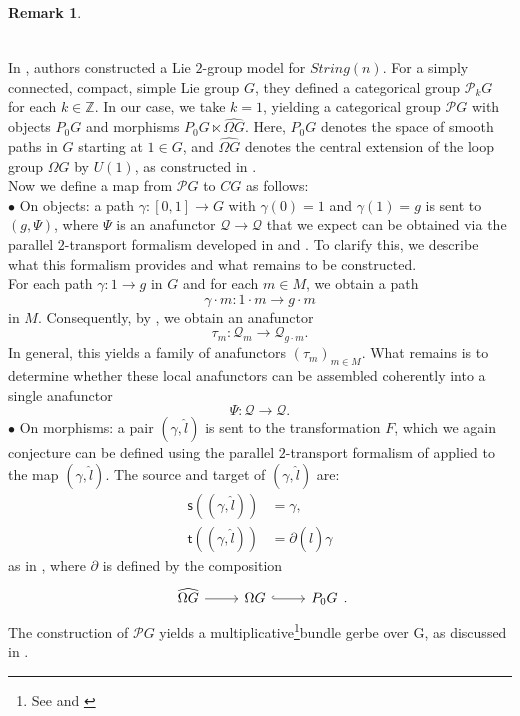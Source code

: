 \documentclass{article}
\theoremstyle{plain}
\theoremstyle{definition}
\newtheorem{rem}[thm]{Remark}
\begin{document}
\begin{rem}
\[\begin{tikzcd}
\end{tikzcd}
\]
In \cite{MR2366945}, authors constructed a Lie $2$-group model for $String(n)$. For a simply connected, compact, simple Lie group $G$, they defined a categorical group $\mathcal{P}_k G$ for each $k \in \mathbb{Z}$. In our case, we take $k=1$, yielding a categorical group $\mathcal{P}G$ with objects $P_0 G$ and morphisms $P_0 G \ltimes \widehat{\Omega G}$. Here, $P_0 G$ denotes the space of smooth paths in $G$ starting at $1 \in G$, and $\widehat{\Omega G}$ denotes the central extension of the loop group $\Omega G$ by $U(1)$, as constructed in \cite{MR2366945}. \\
Now we define a map from $\mathcal{P}G$ to $CG$ as follows: \\
$\bullet$ On objects: a path $\gamma:[0,1] \to G$ with $\gamma(0) = 1$ and $\gamma(1) = g$ is sent to $(g,\Psi)$, where $\Psi$ is an anafunctor $\mathcal{Q} \longrightarrow \mathcal{Q}$ that we expect can be obtained via the parallel $2$-transport formalism developed in \cite{MR3917427} and \cite{MR3084724}. To clarify this, we describe what this formalism provides and what remains to be constructed. \\
For each path $\gamma:1 \longrightarrow g$ in $G$ and for each $m \in M$, we obtain a path
$$\gamma \cdot m:1 \cdot m \longrightarrow g \cdot m$$
in $M$. Consequently, by \cite{MR3917427}, we obtain an anafunctor
\[
\tau_m:\mathcal{Q}_m \longrightarrow \mathcal{Q}_{g \cdot m}.
\]
In general, this yields a family of anafunctors $(\tau_m)_{m \in M}$. What remains is to determine whether these local anafunctors can be assembled coherently into a single anafunctor
$$\Psi:\mathcal{Q} \longrightarrow \mathcal{Q}.$$
$\bullet$ On morphisms: a pair $(\gamma,\hat{l})$ is sent to the transformation $F$, which we again conjecture can be defined using the parallel $2$-transport formalism of \cite{MR3917427} applied to the map $(\gamma,\hat{l})$. The source and target of $(\gamma,\hat{l})$ are:
\begin{align*}
\mathsf{s}\left((\gamma,\hat{l})\right) & = \gamma, \\
\mathsf{t}\left((\gamma,\hat{l})\right) & = \partial(\hat{l})\gamma
\end{align*}
as in \cite[Proposition 4.1 on page 117]{MR2366945}, where $\partial$ is defined by the composition
\[
\begin{tikzcd}
\widehat{\Omega G} \arrow[r] & \Omega G \arrow[r,hook] & P_0 G
\end{tikzcd}.
\]
The construction of $\mathcal{P}G$ yields a multiplicative\footnote{See \cite[page 314]{MR2610397} and \cite[Proposition 5.2 on page 597]{MR2174418}}bundle gerbe over G, as discussed in \cite{MR2366945}.
\end{rem}
\end{document}
